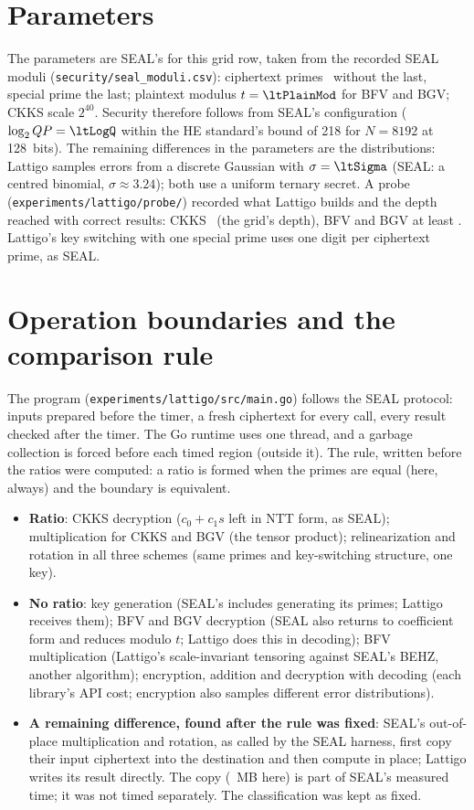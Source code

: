 \documentclass[11pt]{article}
\begin{document}
\section{Parameters}

The parameters are SEAL's for this grid row, taken from the recorded SEAL moduli (\texttt{security/seal\_moduli.csv}): ciphertext primes \ltChain\ without the last, special prime the last; plaintext modulus $t = \ltPlainMod$ for BFV and BGV; CKKS scale $2^{40}$. Security therefore follows from SEAL's configuration ($\log_2 QP = \ltLogQ$ within the HE standard's bound of 218 for $N{=}8192$ at 128~bits). The remaining differences in the parameters are the distributions: Lattigo samples errors from a discrete Gaussian with $\sigma = \ltSigma$ (SEAL: a centred binomial, $\sigma \approx 3.24$); both use a uniform ternary secret. A probe (\texttt{experiments/lattigo/probe/}) recorded what Lattigo builds and the depth reached with correct results: CKKS \ltDepthCkks\ (the grid's depth), BFV and BGV at least \ltDepthBgv. Lattigo's key switching with one special prime uses one digit per ciphertext prime, as SEAL.

\section{Operation boundaries and the comparison rule}

The program (\texttt{experiments/lattigo/src/main.go}) follows the SEAL protocol: inputs prepared before the timer, a fresh ciphertext for every call, every result checked after the timer. The Go runtime uses one thread, and a garbage collection is forced before each timed region (outside it). The rule, written before the ratios were computed: a ratio is formed when the primes are equal (here, always) and the boundary is equivalent.
\begin{itemize}[leftmargin=*, itemsep=1pt]
  \item \textbf{Ratio}: CKKS decryption ($c_0 + c_1 s$ left in NTT form, as SEAL); multiplication for CKKS and BGV (the tensor product); relinearization and rotation in all three schemes (same primes and key-switching structure, one key).
  \item \textbf{No ratio}: key generation (SEAL's includes generating its primes; Lattigo receives them); BFV and BGV decryption (SEAL also returns to coefficient form and reduces modulo $t$; Lattigo does this in decoding); BFV multiplication (Lattigo's scale-invariant tensoring against SEAL's BEHZ, another algorithm); encryption, addition and decryption with decoding (each library's API cost; encryption also samples different error distributions).
  \item \textbf{A remaining difference, found after the rule was fixed}: SEAL's out-of-place multiplication and rotation, as called by the SEAL harness, first copy their input ciphertext into the destination and then compute in place; Lattigo writes its result directly. The copy (\ltCopyMB~MB here) is part of SEAL's measured time; it was not timed separately. The classification was kept as fixed.
\end{itemize}
\end{document}
